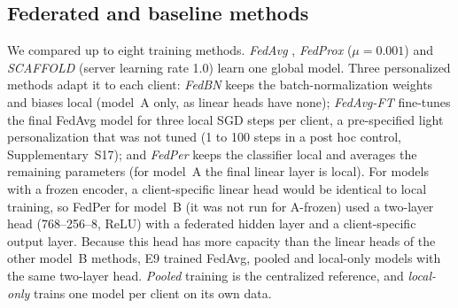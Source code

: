 \subsection{Federated and baseline methods}
\label{sec:methods-fl}

We compared up to eight training methods. \emph{FedAvg} \cite{mcmahan2017fedavg}, \emph{FedProx}
\cite{li2020fedprox} ($\mu=0.001$) and \emph{SCAFFOLD} \cite{karimireddy2020scaffold} (server learning
rate 1.0) learn one global model. Three personalized methods adapt it to each client:
\emph{FedBN} \cite{li2021fedbn} keeps the batch-normalization weights and biases local (model~A only, as
linear heads have none); \emph{FedAvg-FT} fine-tunes the final FedAvg model for three local SGD steps per
client, a pre-specified light personalization that was not tuned (1 to 100 steps in a post hoc control,
Supplementary~S17); and \emph{FedPer}
\cite{arivazhagan2019fedper} keeps the classifier local and averages the remaining parameters (for
model~A the final linear layer is local). For models with a frozen encoder, a client-specific linear head
would be identical to local training, so FedPer for model~B (it was not run for A-frozen) used a two-layer head (768--256--8, ReLU) with a
federated hidden layer and a client-specific output layer. Because this head has more capacity than the
linear heads of the other model~B methods, E9 trained FedAvg, pooled and local-only models with the same
two-layer head. \emph{Pooled} training is the centralized reference, and \emph{local-only} trains one model
per client on its own data.


